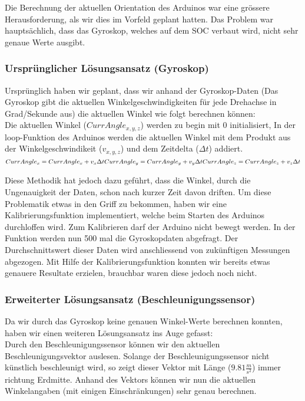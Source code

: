
Die Berechnung der aktuellen Orientation des Arduinos war eine grössere Herausforderung,
als wir dies im Vorfeld geplant hatten. Das Problem war hauptsächlich, dass das Gyroskop, welches auf dem SOC verbaut wird, nicht sehr genaue Werte ausgibt.

\subsubsection{Ursprünglicher Lösungsansatz (Gyroskop)}
Ursprünglich haben wir geplant, dass wir anhand der Gyroskop-Daten 
(Das Gyroskop gibt die aktuellen Winkelgeschwindigkeiten für jede Drehachse in Grad/Sekunde aus) 
die aktuellen Winkel wie folgt berechnen können:\\

Die aktuellen Winkel (\begin{math}CurrAngle_{x,y,z}\end{math}) werden zu begin mit 0 initialisiert, In der loop-Funktion des Arduinos werden die aktuellen Winkel mit dem Produkt aus der Winkelgeschwindikeit (\begin{math}v_{x,y,z}\end{math}) und dem Zeitdelta (\begin{math}\Delta{t}\end{math}) addiert.\\

\begin{math}
  CurrAngle_x = CurrAngle_x + v_x \Delta t  \\
  CurrAngle_y = CurrAngle_y + v_y \Delta t  \\
  CurrAngle_z = CurrAngle_z + v_z \Delta t  \\
\end{math}

Diese Methodik hat jedoch dazu geführt, dass die Winkel, durch die Ungenauigkeit der Daten, schon nach kurzer Zeit davon driften.
Um diese Problematik etwas in den Griff zu bekommen, haben wir eine Kalibrierungsfunktion implementiert, welche beim Starten des Arduinos durchloffen wird.
Zum Kalibrieren darf der Arduino nicht bewegt werden. In der Funktion werden nun 500 mal die Gyroskopdaten abgefragt.
Der Durchschnittswert dieser Daten wird anschliessend von zukünftigen Messungen abgezogen.
Mit Hilfe der Kalibrierungsfunktion konnten wir bereits etwas genauere Resultate erzielen, brauchbar waren diese jedoch  noch nicht.

\subsubsection{Erweiterter Lösungsansatz (Beschleunigungssensor)}
Da wir durch das Gyroskop keine genauen Winkel-Werte berechnen konnten, haben wir einen weiteren Lösungsansatz ins Auge gefasst:\\
Durch den Beschleunigungssensor können wir den aktuellen Beschleunigungsvektor auslesen. Solange der Beschleunigungssensor nicht künstlich beschleunigt wird, 
so zeigt dieser Vektor mit Länge (\begin{math}9.81\frac{m}{s^2}\end{math}) immer richtung Erdmitte. Anhand des Vektors können wir nun die aktuellen Winkelangaben (mit einigen Einschränkungen) sehr genau berechnen.

